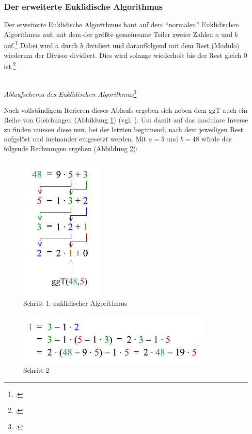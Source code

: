 \documentclass{scrarticle}
\begin{document}
        \subsubsection{Der erweiterte Euklidische Algorithmus}
            Der erweiterte Euklidische Algorithmus baut auf dem \enquote{normalen} Euklidischen Algorithmus auf, mit dem der größte gemeinsame Teiler zweier Zahlen $a$ und $b$ auf.\footcite[vgl.][]{erweA} Dabei wird $a$ durch $b$ dividiert und darauffolgend mit dem Rest (Modulo) wiederum der Divisor dividiert. Dies wird solange wiederholt bis der Rest gleich $0$ ist.\footcite[vgl.][]{matbib-eka}
            \begin{center}
            \\
            \emph{Ablaufschema des Euklidischen Algorithmus}\footcite{zum2020}\\                   
            \end{center}
            Nach vollständigem Iterieren dieses Ablaufs ergeben sich neben dem ggT auch ein Reihe von Gleichungen (Abbildung \ref{fig:euklid}) (vgl. \cite{erweA}). Um damit auf das modulare Inverse zu finden müssen diese nun, bei der letzten beginnend, nach dem jeweiligen Rest aufgelöst und ineinander eingesetzt werden. Mit $a=5$ und $b=48$ würde das folgende Rechnungen ergeben (Abbildung \ref{fig:erweuklid}):\\
            \begin{figure}[h!]
                \centering
                \includegraphics{content/euklid.png}
                \caption{Schritt 1: euklidischer Algorithmus\protect\footnotemark}
                \label{fig:euklid}
            \end{figure}
            \begin{figure}[h!]
                \centering
                \includegraphics{content/erweuklid.png}
                \caption{Schritt 2\protect\footnotemark}
                \label{fig:erweuklid}
            \end{figure}
\end{document}
